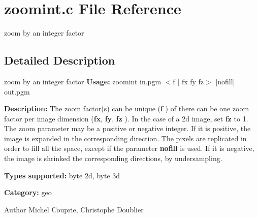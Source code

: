 \section{zoomint.c File Reference}
\label{zoomint_8c}


zoom by an integer factor  




\subsection{Detailed Description}
zoom by an integer factor {\bfseries Usage:} zoomint in.pgm $<$f $|$ fx fy fz$>$ [nofill] out.pgm

{\bfseries Description:} The zoom factor(s) can be unique ({\bfseries f} ) of there can be one zoom factor per image dimension ({\bfseries fx}, {\bfseries fy}, {\bfseries fz} ). In the case of a 2d image, set {\bfseries fz} to 1. The zoom parameter may be a positive or negative integer. If it is positive, the image is expanded in the corresponding direction. The pixels are replicated in order to fill all the space, except if the parameter {\bfseries nofill} is used. If it is negative, the image is shrinked the corresponding directions, by undersampling.

{\bfseries Types supported:} byte 2d, byte 3d

{\bfseries Category:} geo

\begin{DoxyAuthor}{Author}
Michel Couprie, Christophe Doublier 
\end{DoxyAuthor}
